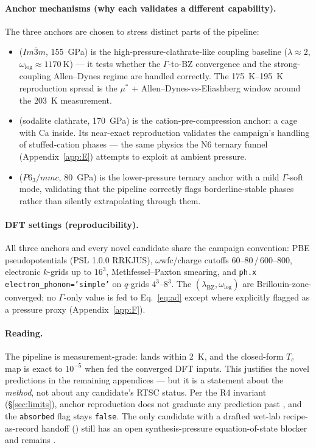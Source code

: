 \paragraph{Anchor mechanisms (why each validates a different capability).}
The three anchors are chosen to stress distinct parts of the pipeline:
\begin{itemize}\itemsep0.2em
\item {} ($Im\bar{3}m$, \SI{155}{\giga\pascal}) is the
  high-pressure-clathrate-like coupling baseline ($\lambda\approx2$,
  $\omega_{\log}\approx\SI{1170}{\kelvin}$) --- it tests whether the
  $\Gamma$-to-BZ convergence and the strong-coupling Allen--Dynes regime are
  handled correctly. The \SIrange{175}{195}{\kelvin} reproduction spread is
  the $\mu^\ast$ + Allen--Dynes-vs-Eliashberg window around the
  \SI{203}{\kelvin} measurement.
\item {} (sodalite clathrate, \SI{170}{\giga\pascal}) is the
  cation-pre-compression anchor: a  cage with Ca inside. Its
  near-exact reproduction validates the campaign's handling of stuffed-cation
  phases --- the same physics the N6 ternary funnel (Appendix~\ref{app:E})
  attempts to exploit at ambient pressure.
\item {} ($P6_3/mmc$, \SI{80}{\giga\pascal}) is the lower-pressure
  ternary anchor with a mild $\Gamma$-soft mode, validating that the
  pipeline correctly flags borderline-stable phases rather than silently
  extrapolating through them.
\end{itemize}

\paragraph{DFT settings (reproducibility).}
All three anchors and every novel candidate share the campaign convention:
PBE pseudopotentials (PSL 1.0.0 RRKJUS), $\omega$wfc/charge cutoffs
\SIrange{60}{80}{\rydberg}\,/\,\SIrange{600}{800}{\rydberg}, electronic
$k$-grids up to $16^3$, Methfessel--Paxton smearing, and \texttt{ph.x}
\texttt{electron\_phonon='simple'} on $q$-grids $4^3$--$8^3$. The
$(\lambda_{\mathrm{BZ}},\omega_{\log})$ are Brillouin-zone-converged; no
$\Gamma$-only value is fed to Eq.~\eqref{eq:ad} except where explicitly
flagged as a pressure proxy (Appendix~\ref{app:F}).

\paragraph{Reading.}
The pipeline is measurement-grade:  lands within \SI{2}{\kelvin},
and the closed-form $T_c$ map is exact to $10^{-5}$ when fed the converged
DFT inputs. This justifies the novel predictions in the remaining
appendices --- but it is a statement about the \emph{method}, not about any
candidate's RTSC status. Per the R4 invariant (\S\ref{sec:limits}), anchor
reproduction does not graduate any prediction past \tierGreen, and the
\texttt{absorbed} flag stays \texttt{false}. The only candidate with a
drafted wet-lab recipe-as-record handoff () still has an open
synthesis-pressure equation-of-state blocker and remains \tierOrange.
